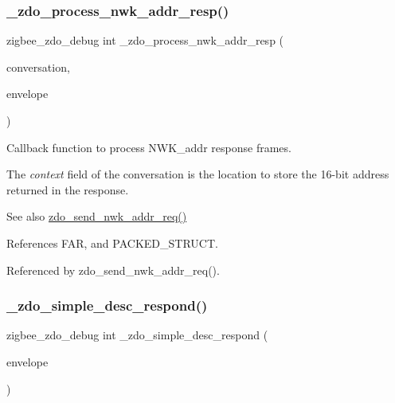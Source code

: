 \subsubsection{\texorpdfstring{\+\_\+zdo\+\_\+process\+\_\+nwk\+\_\+addr\+\_\+resp()}{\_zdo\_process\_nwk\_addr\_resp()}}
{\footnotesize\ttfamily zigbee\+\_\+zdo\+\_\+debug int \+\_\+zdo\+\_\+process\+\_\+nwk\+\_\+addr\+\_\+resp (\begin{DoxyParamCaption}\item[{\hyperlink{structwpan__conversation__t}{wpan\+\_\+conversation\+\_\+t} \hyperlink{group__hal_gaef060b3456fdcc093a7210a762d5f2ed}{F\+AR} $\ast$}]{conversation,  }\item[{const \hyperlink{structwpan__envelope__t}{wpan\+\_\+envelope\+\_\+t} \hyperlink{group__hal_gaef060b3456fdcc093a7210a762d5f2ed}{F\+AR} $\ast$}]{envelope }\end{DoxyParamCaption})}



Callback function to process N\+W\+K\+\_\+addr response frames. 

The {\itshape context} field of the conversation is the location to store the 16-\/bit address returned in the response.

\begin{DoxySeeAlso}{See also}
\hyperlink{group__zdo_ga40f076c190ab2390836687b8e1f705eb}{zdo\+\_\+send\+\_\+nwk\+\_\+addr\+\_\+req()} 
\end{DoxySeeAlso}


References F\+AR, and P\+A\+C\+K\+E\+D\+\_\+\+S\+T\+R\+U\+CT.



Referenced by zdo\+\_\+send\+\_\+nwk\+\_\+addr\+\_\+req().

\mbox{\label{group__zdo_gaa70aa4bcb14a98c69e7a54a9971ea194}} 
\subsubsection{\texorpdfstring{\+\_\+zdo\+\_\+simple\+\_\+desc\+\_\+respond()}{\_zdo\_simple\_desc\_respond()}}
{\footnotesize\ttfamily zigbee\+\_\+zdo\+\_\+debug int \+\_\+zdo\+\_\+simple\+\_\+desc\+\_\+respond (\begin{DoxyParamCaption}\item[{const \hyperlink{structwpan__envelope__t}{wpan\+\_\+envelope\+\_\+t} \hyperlink{group__hal_gaef060b3456fdcc093a7210a762d5f2ed}{F\+AR} $\ast$}]{envelope }\end{DoxyParamCaption})}



